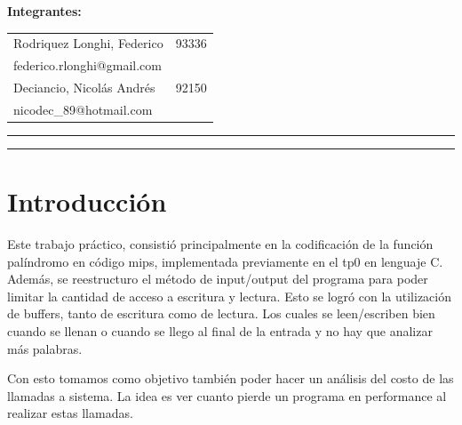 \documentclass[11pt,a4paper]{article}
\newcommand\blankpage{%
	\null
	\thispagestyle{empty}%
	\addtocounter{page}{-1}%
	\newpage}
\begin{document}
\begin{titlepage}
	\begin{flushleft}
	\begin{table}[H]
		\begin{flushleft}
		\textbf{Integrantes:}\\
		\vspace{0.01\textheight}
		\begin{tabular}{l r}
			Rodriquez Longhi, Federico  & 93336\\
			\hspace{0.05\textheight}federico.rlonghi@gmail.com&\\
			Deciancio, Nicolás Andrés   & 92150\\
			\hspace{0.05\textheight}nicodec\_89@hotmail.com&\\
		\end{tabular}
		\end{flushleft}
	\end{table}
		

	\end{flushleft}
	\vspace{0.05\textheight}
	\vspace{2pt}
	\vfill
	\rule{\textwidth}{1pt}\par %
	\vspace{2pt}\vspace{-\baselineskip} %
	\rule{\textwidth}{0.4pt}\par %
	
\end{titlepage}

\blankpage

\tableofcontents

\newpage

\section{Introducción}

Este trabajo práctico, consistió principalmente en la codificación de la función palíndromo en código mips, implementada previamente en el tp0 en lenguaje C. Además, se reestructuro el método de input/output del programa para poder limitar la cantidad de acceso a escritura y lectura. Esto se logró con la utilización de buffers, tanto de escritura como de lectura. Los cuales se leen/escriben bien cuando se llenan o cuando se llego al final de la entrada y no hay que analizar más palabras.

Con esto tomamos como objetivo también poder hacer un análisis del costo de las llamadas a sistema. La idea es ver cuanto pierde un programa en performance al realizar estas llamadas.
\end{document}
